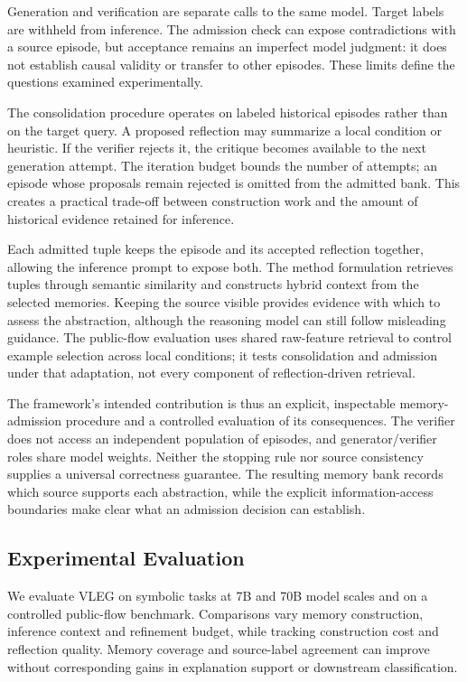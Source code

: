 \documentclass[onecolumn]{IEEEtran}
\numberwithin{equation}{section}
\theoremstyle{definition}
\theoremstyle{remark}
\begin{document}
Generation and verification are separate calls to the same model. Target labels are withheld from inference. The admission check can expose contradictions with a source episode, but acceptance remains an imperfect model judgment: it does not establish causal validity or transfer to other episodes. These limits define the questions examined experimentally.

The consolidation procedure operates on labeled historical episodes rather than on the target query. A proposed reflection may summarize a local condition or heuristic. If the verifier rejects it, the critique becomes available to the next generation attempt. The iteration budget bounds the number of attempts; an episode whose proposals remain rejected is omitted from the admitted bank. This creates a practical trade-off between construction work and the amount of historical evidence retained for inference.

Each admitted tuple keeps the episode and its accepted reflection together, allowing the inference prompt to expose both. The method formulation retrieves tuples through semantic similarity and constructs hybrid context from the selected memories. Keeping the source visible provides evidence with which to assess the abstraction, although the reasoning model can still follow misleading guidance. The public-flow evaluation uses shared raw-feature retrieval to control example selection across local conditions; it tests consolidation and admission under that adaptation, not every component of reflection-driven retrieval.

The framework's intended contribution is thus an explicit, inspectable memory-admission procedure and a controlled evaluation of its consequences. The verifier does not access an independent population of episodes, and generator/verifier roles share model weights. Neither the stopping rule nor source consistency supplies a universal correctness guarantee. The resulting memory bank records which source supports each abstraction, while the explicit information-access boundaries make clear what an admission decision can establish.

\subsection{Experimental Evaluation}
We evaluate VLEG on symbolic tasks at 7B and 70B model scales and on a controlled public-flow benchmark. Comparisons vary memory construction, inference context and refinement budget, while tracking construction cost and reflection quality. Memory coverage and source-label agreement can improve without corresponding gains in explanation support or downstream classification.
\end{document}
